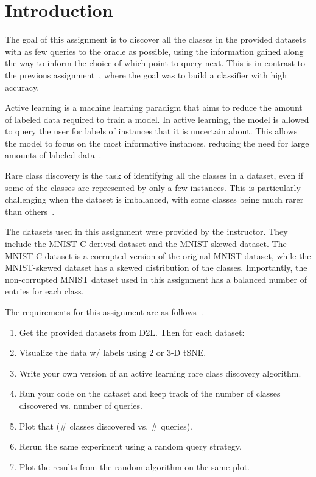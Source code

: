 \section{Introduction}
The goal of this assignment is to discover all the classes in the provided datasets with as few queries to the oracle as possible, using the information gained along the way to inform the choice of which point to query next. This is in contrast to the previous assignment~\cite{assignment8}, where the goal was to build a classifier with high accuracy.

Active learning is a machine learning paradigm that aims to reduce the amount of labeled data required to train a model. In active learning, the model is allowed to query the user for labels of instances that it is uncertain about. This allows the model to focus on the most informative instances, reducing the need for large amounts of labeled data~\cite{tharwat2023survey}.

Rare class discovery is the task of identifying all the classes in a dataset, even if some of the classes are represented by only a few instances. This is particularly challenging when the dataset is imbalanced, with some classes being much rarer than others~\cite{zhou2023rare}.

The datasets used in this assignment were provided by the instructor. They include the MNIST-C derived dataset and the MNIST-skewed dataset. The MNIST-C dataset is a corrupted version of the original MNIST dataset, while the MNIST-skewed dataset has a skewed distribution of the classes. Importantly, the non-corrupted MNIST dataset used in this assignment has a balanced number of entries for each class.

The requirements for this assignment are as follows~\cite{assignment9}.
\begin{enumerate}    
    \item Get the provided datasets from D2L. Then for each dataset:
    \item Visualize the data w/ labels using 2 or 3-D tSNE.
    \item Write your own version of an active learning rare class discovery algorithm.
    \item Run your code on the dataset and keep track of the number of classes discovered vs. number of queries.
    \item Plot that (\# classes discovered vs. \# queries).
    \item Rerun the same experiment using a random query strategy.
    \item Plot the results from the random algorithm on the same plot.    
\end{enumerate}


